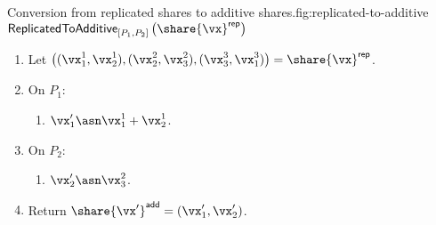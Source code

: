 \begin{Boxfig}{Conversion from replicated shares to additive shares.}{fig:replicated-to-additive}
  {$\mathsf{ReplicatedToAdditive}_{[P_1, P_2]}\left( \share{\vx}^{\mathsf{rep}} \right)$}

  \begin{enumerate}

  \item Let $\left( (\vx_1^1, \vx_2^1), (\vx_2^2, \vx_3^2), (\vx_3^3, \vx_1^3) \right) = \share{\vx}^{\mathsf{rep}}$.

  \item On $P_1$:
    \begin{enumerate}
    \item $\vx'_1 \asn \vx^1_1 + \vx^1_2$.
    \end{enumerate}

  \item On $P_2$:
    \begin{enumerate}
    \item $\vx'_2 \asn \vx^2_3$.
    \end{enumerate}

  \item Return $\share{\vx'}^{\mathsf{add}} = (\vx'_1, \vx'_2)$.
\end{enumerate}
\end{Boxfig}








